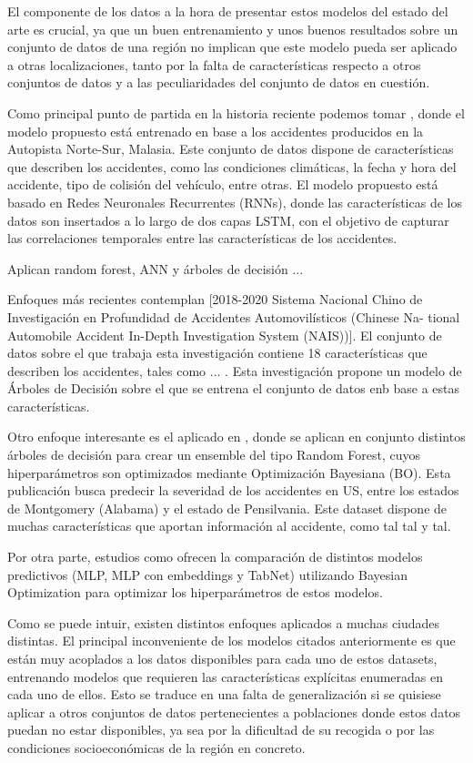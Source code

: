 \documentclass{uathesis-es}
\begin{document}
El componente de los datos a la hora de presentar estos modelos del estado del arte es crucial, ya que un buen entrenamiento y unos buenos resultados sobre un conjunto de datos de una región no implican que este modelo pueda ser aplicado a otras localizaciones, tanto por la falta de características respecto a otros conjuntos de datos y a las peculiaridades del conjunto de datos en cuestión.


Como principal punto de partida en la historia reciente podemos tomar \cite{app7060476}, donde el modelo propuesto está entrenado en base a los accidentes producidos en la Autopista Norte-Sur, Malasia. Este conjunto de datos dispone de características que describen los accidentes, como las condiciones climáticas, la fecha y hora del accidente, tipo de colisión del vehículo, entre otras. El modelo propuesto está basado en Redes Neuronales Recurrentes (RNNs), donde las características de los datos son insertados a lo largo de dos capas LSTM, con el objetivo de capturar las correlaciones temporales entre las características de los accidentes.

Aplican random forest, ANN y árboles de decisión \cite{app10010129}...


Enfoques más recientes contemplan \cite{Yang2023} [2018-2020 Sistema Nacional Chino de Investigación en Profundidad de Accidentes Automovilísticos (Chinese Na- tional Automobile Accident In-Depth Investigation System (NAIS))]. El conjunto de datos sobre el que trabaja esta investigación contiene 18 características que describen los accidentes, tales como ... . Esta investigación propone un modelo de Árboles de Decisión sobre el que se entrena el conjunto de datos enb base a estas características.

Otro enfoque interesante es el aplicado en \cite{su14031729}, donde se aplican en conjunto distintos árboles de decisión para crear un ensemble del tipo Random Forest, cuyos hiperparámetros son optimizados mediante Optimización Bayesiana (BO). Esta publicación busca predecir la severidad de los accidentes en US, entre los estados de Montgomery (Alabama) y el estado de Pensilvania. Este dataset dispone de muchas características que aportan información al accidente, como tal tal y tal.

Por otra parte, estudios como \cite{Sattar2023} ofrecen la comparación de distintos modelos predictivos (MLP, MLP con embeddings y TabNet) utilizando Bayesian Optimization para optimizar los hiperparámetros de estos modelos.

Como se puede intuir, existen distintos enfoques aplicados a muchas ciudades distintas. El principal inconveniente de los modelos citados anteriormente es que están muy acoplados a los datos disponibles para cada uno de estos datasets, entrenando modelos que requieren las características explícitas enumeradas en cada uno de ellos. Esto se traduce en una falta de generalización si se quisiese aplicar a otros conjuntos de datos pertenecientes a poblaciones donde estos datos puedan no estar disponibles, ya sea por la dificultad de su recogida o por las condiciones socioeconómicas de la región en concreto.
\end{document}
